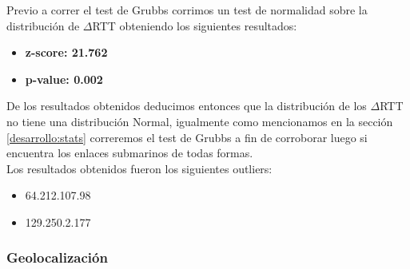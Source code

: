 Previo a correr el test de Grubbs corrimos un test de normalidad sobre la distribución de $\Delta$RTT obteniendo los siguientes resultados:

\begin{itemize}
\item \textbf{z-score: 21.762}
\item \textbf{p-value: 0.002}
\end{itemize}

De los resultados obtenidos deducimos entonces que la distribución de los $\Delta$RTT no tiene una distribución Normal, igualmente como mencionamos en la sección \ref{desarrollo:stats} correremos el test de Grubbs a fin de corroborar luego si encuentra los enlaces submarinos de todas formas.\\
Los resultados obtenidos fueron los siguientes outliers:

\begin{itemize}
\item 64.212.107.98
\item 129.250.2.177
\end{itemize}

\subsubsection{Geolocalización}

